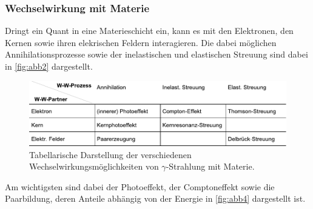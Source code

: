 \subsubsection*{Wechselwirkung mit Materie}

Dringt ein Quant in eine Materieschicht ein, kann es mit den
Elektronen, den Kernen sowie ihren elekrischen Feldern interagieren.
Die dabei möglichen Annihilationsprozesse sowie der inelastischen
und elastischen Streuung sind dabei in \autoref{fig:abb2} dargestellt.

\begin{figure}[H]
    \centering
    \includegraphics{figures/abb2.pdf}
    \caption{Tabellarische Darstellung der verschiedenen Wechselwirkungsmöglichkeiten von $\gamma$-Strahlung mit Materie\cite{ap04}.}
    \label{fig:abb2}
\end{figure}

Am wichtigsten sind dabei der Photoeffekt, der Comptoneffekt sowie
die Paarbildung, deren Anteile abhängig von der Energie in \autoref{fig:abb4}
dargestellt ist.

